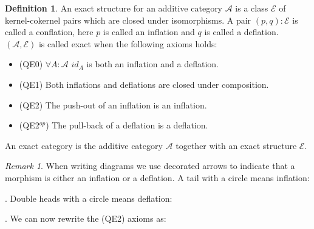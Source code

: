 \documentclass[12pt]{article}
\theoremstyle{definition}
\newtheorem{definition}{Definition}[section]
\theoremstyle{remark}
\newtheorem*{remark}{Remark}
\begin{document}
            \begin{definition}
                An exact structure for an additive category $\mathcal{A}$ is a class $\mathcal{E}$ of kernel-cokernel pairs which are closed under isomorphisms. A pair $(p,q):\mathcal{E}$ is called a conflation, here $p$ is called an inflation and $q$ is called a deflation. $(\mathcal{A},\mathcal{E})$ is called exact when the following axioms holds:
                \begin{itemize}
                    \item (QE0) $\forall A:\mathcal{A}$ $id_A$ is both an inflation and a deflation.
                    \item (QE1) Both inflations and deflations are closed under composition.
                    \item (QE2) The push-out of an inflation is an inflation.
                    \item (QE2$^{op}$) The pull-back of a deflation is a deflation.
                \end{itemize}

                An exact category is the additive category $\mathcal{A}$ together with an exact structure $\mathcal{E}$.
            \end{definition}


            \begin{remark}
                When writing diagrams we use decorated arrows to indicate that a morphism is either an inflation or a deflation. A tail with a circle means inflation: . Double heads with a circle means deflation: . We can now rewrite the (QE2) axioms as:
                \begin{center}
                \end{center}
            \end{remark}
\end{document}
